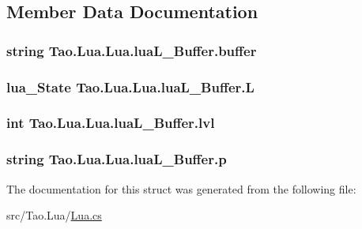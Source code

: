 \subsection{Member Data Documentation}
\hypertarget{struct_tao_1_1_lua_1_1_lua_1_1lua_l___buffer_a637e58ba170ea75e0fee78fa1bc2cc9a}{
\subsubsection[{buffer}]{\setlength{\rightskip}{0pt plus 5cm}string {\bf Tao.Lua.Lua.luaL\_\-Buffer.buffer}}}
\label{struct_tao_1_1_lua_1_1_lua_1_1lua_l___buffer_a637e58ba170ea75e0fee78fa1bc2cc9a}
\hypertarget{struct_tao_1_1_lua_1_1_lua_1_1lua_l___buffer_a7e57fbb80f24064133e75fe20fd9d1b0}{
\subsubsection[{L}]{\setlength{\rightskip}{0pt plus 5cm}lua\_\-State {\bf Tao.Lua.Lua.luaL\_\-Buffer.L}}}
\label{struct_tao_1_1_lua_1_1_lua_1_1lua_l___buffer_a7e57fbb80f24064133e75fe20fd9d1b0}
\hypertarget{struct_tao_1_1_lua_1_1_lua_1_1lua_l___buffer_a9aab36eef12e587122e55d2b30971849}{
\subsubsection[{lvl}]{\setlength{\rightskip}{0pt plus 5cm}int {\bf Tao.Lua.Lua.luaL\_\-Buffer.lvl}}}
\label{struct_tao_1_1_lua_1_1_lua_1_1lua_l___buffer_a9aab36eef12e587122e55d2b30971849}
\hypertarget{struct_tao_1_1_lua_1_1_lua_1_1lua_l___buffer_aac23e6b1ca485b28a8af39963e3672ff}{
\subsubsection[{p}]{\setlength{\rightskip}{0pt plus 5cm}string {\bf Tao.Lua.Lua.luaL\_\-Buffer.p}}}
\label{struct_tao_1_1_lua_1_1_lua_1_1lua_l___buffer_aac23e6b1ca485b28a8af39963e3672ff}


The documentation for this struct was generated from the following file:\begin{DoxyCompactItemize}
\item 
src/Tao.Lua/\hyperlink{_lua_8cs}{Lua.cs}\end{DoxyCompactItemize}
